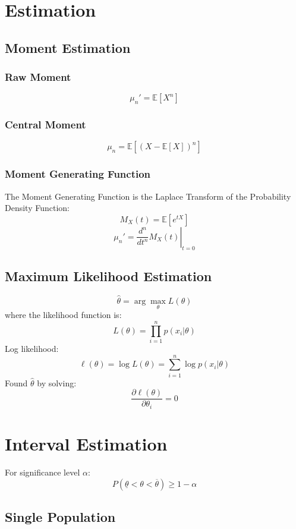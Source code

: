 \documentclass{article}
\begin{document}
\newpage
\section{Estimation}

\subsection{Moment Estimation}

\subsubsection{Raw Moment}
\[
    \mu_n' = \mathbb{E}[X^n]
\]

\subsubsection{Central Moment}
\[
    \mu_n = \mathbb{E}[(X - \mathbb{E}[X])^n]
\]

\subsubsection{Moment Generating Function}
The Moment Generating Function is the Laplace Transform of the Probability Density Function:
\[
    M_X(t) = \mathbb{E}[e^{tX}]
\]
\[
    \mu_n' = \left.\frac{d^n}{dt^n} M_X(t)\right|_{t=0}
\]

\subsection{Maximum Likelihood Estimation}
\[
    \hat{\theta} = \arg\max_\theta L(\theta)
\]
where the likelihood function is:
\[
    L(\theta) = \prod_{i=1}^{n} p(x_i|\theta)
\]
Log likelihood:
\[
    \ell(\theta) = \log L(\theta) = \sum_{i=1}^{n} \log p(x_i|\theta)
\]
Found $\hat{\theta}$ by solving:
\[
    \frac{\partial \ell(\theta)}{\partial \theta_i} = 0
\]


\newpage
\section{Interval Estimation}

For significance level $\alpha$:
\[
    P(\underline{\theta} < \theta < \overline{\theta}) \geq 1 - \alpha
\]

\subsection{Single Population}
\end{document}

